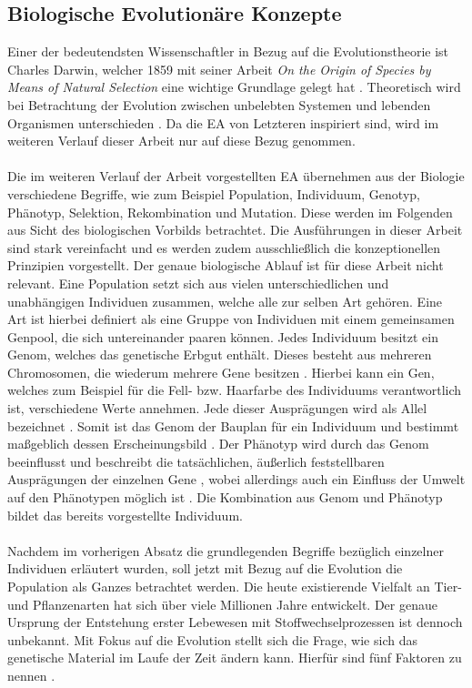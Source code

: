 \subsection{Biologische Evolutionäre Konzepte}
\label{subsec:biological_evolution}
Einer der bedeutendsten Wissenschaftler in Bezug auf die Evolutionstheorie ist Charles Darwin, welcher 1859 mit seiner Arbeit \emph{On the Origin of Species by Means of Natural Selection} eine wichtige Grundlage gelegt hat \cite{russell2013kunstliche}. Theoretisch wird bei Betrachtung der Evolution zwischen unbelebten Systemen und lebenden Organismen unterschieden \cite{weicker2015evolutionare}. Da die \ac{EA} von Letzteren inspiriert sind, wird im weiteren Verlauf dieser Arbeit nur auf diese Bezug genommen.
\\\\
Die im weiteren Verlauf der Arbeit vorgestellten \ac{EA} übernehmen aus der Biologie verschiedene Begriffe, wie zum Beispiel Population, Individuum, Genotyp, Phänotyp, Selektion, Rekombination und Mutation. Diese werden im Folgenden aus Sicht des biologischen Vorbilds betrachtet. Die Ausführungen in dieser Arbeit sind stark vereinfacht und es werden zudem ausschließlich die konzeptionellen Prinzipien vorgestellt. Der genaue biologische Ablauf ist für diese Arbeit nicht relevant. Eine Population setzt sich aus vielen unterschiedlichen und unabhängigen Individuen zusammen, welche alle zur selben Art gehören. Eine Art ist hierbei definiert als eine Gruppe von Individuen mit einem gemeinsamen Genpool, die sich untereinander paaren können. Jedes Individuum besitzt ein Genom, welches das genetische Erbgut enthält. Dieses besteht aus mehreren Chromosomen, die wiederum mehrere Gene besitzen \cite{weicker2015evolutionare}. Hierbei kann ein Gen, welches zum Beispiel für die Fell- bzw. Haarfarbe des Individuums verantwortlich ist, verschiedene Werte annehmen. Jede dieser Ausprägungen wird als Allel bezeichnet \cite{weicker2015evolutionare}. Somit ist das Genom der Bauplan für ein Individuum und bestimmt maßgeblich dessen Erscheinungsbild \cite{kirschbaum2008biopsychologie}. Der Phänotyp wird durch das Genom beeinflusst und beschreibt die tatsächlichen, äußerlich feststellbaren Ausprägungen der einzelnen Gene \cite{weicker2015evolutionare}, wobei allerdings auch ein Einfluss der Umwelt auf den Phänotypen möglich ist \cite{kirschbaum2008biopsychologie}. Die Kombination aus Genom und Phänotyp bildet das bereits vorgestellte Individuum. 
\\\\
Nachdem im vorherigen Absatz die grundlegenden Begriffe bezüglich einzelner Individuen erläutert wurden, soll jetzt mit Bezug auf die Evolution die Population als Ganzes betrachtet werden. Die heute existierende Vielfalt an Tier- und Pflanzenarten hat sich über viele Millionen Jahre entwickelt. Der genaue Ursprung der Entstehung erster Lebewesen mit Stoffwechselprozessen ist dennoch unbekannt. Mit Fokus auf die Evolution stellt sich die Frage, wie sich das genetische Material im Laufe der Zeit ändern kann. Hierfür sind fünf Faktoren zu nennen \cite{weicker2015evolutionare}.
